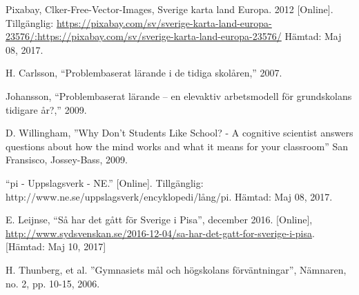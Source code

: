     Pixabay, Clker-Free-Vector-Images, Sverige karta land Europa. 2012 [Online]. Tillgänglig: \url{https://pixabay.com/sv/sverige-karta-land-europa-23576/:https://pixabay.com/sv/sverige-karta-land-europa-23576/} Hämtad: Maj 08, 2017.
    
    H. Carlsson, “Problembaserat lärande i de tidiga skolåren,” 2007.
    
    Johansson, “Problembaserat lärande – en elevaktiv arbetsmodell för grundskolans tidigare år?,” 2009.
    
    D. Willingham, ''Why Don't Students Like School? - A cognitive scientist answers questions about how the mind works and what it means for your classroom'' 
    San Fransisco,
    Jossey-Bass, 
    2009.
    
    “pi - Uppslagsverk - NE.” [Online]. Tillgänglig: http://www.ne.se/uppslagsverk/encyklopedi/lång/pi. Hämtad: Maj 08, 2017.
    
    E. Leijnse, “Så har det gått för Sverige i Pisa”, december 2016. [Online], \url{http://www.sydsvenskan.se/2016-12-04/sa-har-det-gatt-for-sverige-i-pisa}. 
    [Hämtad: Maj 10, 2017]
    
    H. Thunberg, et al. ”Gymnasiets mål och högskolans förväntningar”, Nämnaren, no. 2, pp. 10-15, 2006.